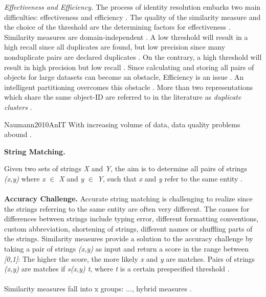\textit{Effectiveness and Efficiency.} The process of identity resolution embarks two main difficulties: effectiveness and efficiency \cite{Bleiholder2009DataF}.
The quality of the similarity measure and the choice of the threshold are the determining factors for effectiveness \cite{Bleiholder2009DataF}.
Similarity measures are domain-independent \cite{Bleiholder2009DataF}.
A low threshold will result in a high recall since all duplicates are found, but low precision since many nonduplicate pairs are declared duplicates \cite{Bleiholder2009DataF}.
On the contrary, a high threshold will result in high precision but low recall \cite{Bleiholder2009DataF}.
Since calculating and storing all pairs of objects for large datasets can become an obstacle, Efficiency is an issue \cite{Bleiholder2009DataF}.
An intelligent partitioning overcomes this obstacle \cite{Bleiholder2009DataF}.
More than two representations which share the same object-ID are referred to in the literature as \textit{duplicate clusters} \cite{Bleiholder2009DataF}.

Naumann2010AnIT
With increasing volume of data, data quality problems abound \cite{Naumann2010AnIT}.

\textbf{String Matching.}


Given two sets of strings \textit{X} and \textit{Y}, the aim is to determine all pairs of strings \textit{(x,y)} where \textit{x} $\in$ \textit{X} and \textit{y} $\in$ \textit{Y}, such that \textit{x} and \textit{y} refer to the same entity \cite{Doan2012PrinciplesOD}. \\
\\
\textbf{Accuracy Challenge.} Accurate string matching is challenging to realize since the strings referring to the same entity are often very different. The causes for differences between strings include typing error, different formatting conventions, custom abbreviation, shortening of strings, different names or shuffling parts of the strings. Similarity measures provide a solution to the accuracy challenge by taking a pair of strings \textit{(x,y)} as input and return a score in the range between \textit{[0,1]}: The higher the score, the more likely \textit{x} and \textit{y} are matches. Pairs of strings \textit{(x,y)} are matches if \textit{s(x,y) \geq t}, where \textit{t} is a certain prespecified threshold \cite{Doan2012PrinciplesOD}. \\
\\
Similarity measures fall into x groups: ..., hybrid measures \cite{Doan2012PrinciplesOD}. \\
\\

